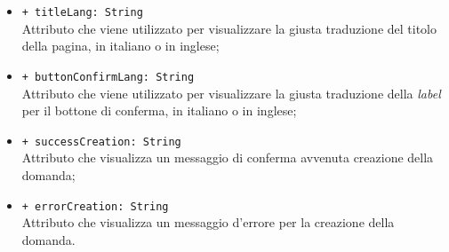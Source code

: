 \begin{itemize}
\begin{itemize}
		\item \texttt{+ titleLang: String} \\ Attributo che viene utilizzato per visualizzare la giusta traduzione del titolo della pagina, in italiano o in inglese;
		\item \texttt{+ buttonConfirmLang: String} \\ Attributo che viene utilizzato per visualizzare la giusta traduzione della \textit{label} per il bottone di conferma, in italiano o in inglese;
		\item \texttt{+ successCreation: String} \\ Attributo che visualizza un messaggio di conferma avvenuta creazione della domanda;
		\item \texttt{+ errorCreation: String} \\ Attributo che visualizza un messaggio d'errore per la creazione della domanda.
	\end{itemize}
\end{itemize}


